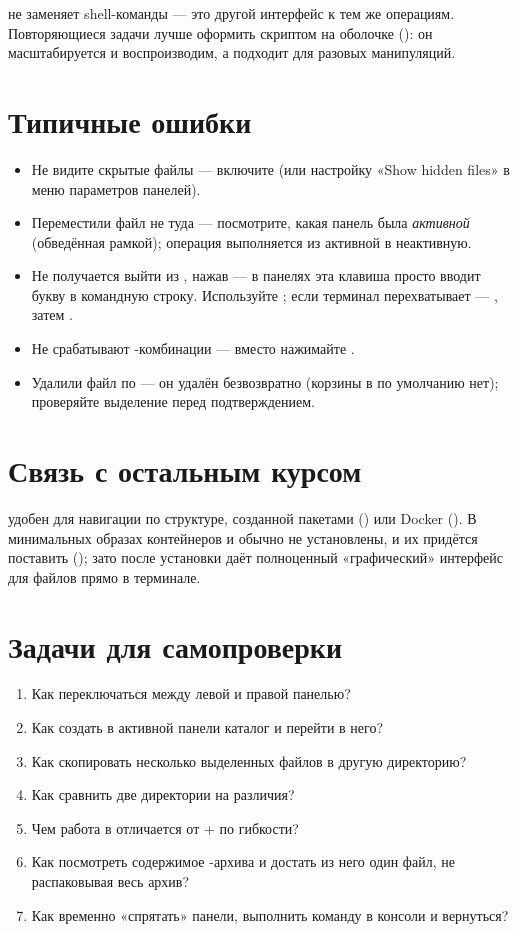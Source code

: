  не заменяет shell-команды --- это другой интерфейс
к тем же операциям. Повторяющиеся задачи лучше оформить
скриптом на оболочке (): он
масштабируется и воспроизводим, а  подходит для
разовых манипуляций.

\section{Типичные ошибки}
\begin{itemize}
  \item Не видите скрытые файлы --- включите
     (или настройку «Show hidden files» в
    меню параметров панелей).
  \item Переместили файл не туда --- посмотрите, какая
    панель была \emph{активной} (обведённая рамкой);
    операция выполняется из активной в неактивную.
  \item Не получается выйти из , нажав 
    --- в панелях эта клавиша просто вводит букву в командную
    строку. Используйте ; если терминал перехватывает
     --- , затем .
  \item Не срабатывают -комбинации --- вместо
     нажимайте .
  \item Удалили файл по  --- он удалён безвозвратно
    (корзины в  по умолчанию нет); проверяйте
    выделение перед подтверждением.
\end{itemize}

\section{Связь с остальным курсом}

 удобен для навигации по структуре, созданной
пакетами () или Docker
(). В минимальных образах
контейнеров  и  обычно не установлены, и
их придётся поставить (); зато после
установки  даёт полноценный «графический»
интерфейс для файлов прямо в терминале.

\section{Задачи для самопроверки}
\begin{enumerate}
  \item Как переключаться между левой и правой панелью?
  \item Как создать в активной панели каталог
    и перейти в него?
  \item Как скопировать несколько выделенных файлов
    в другую директорию?
  \item Как сравнить две директории на различия?
  \item Чем работа в  отличается от 
    +  по гибкости?
  \item Как посмотреть содержимое -архива и достать
    из него один файл, не распаковывая весь архив?
  \item Как временно «спрятать» панели, выполнить команду в
    консоли и вернуться?
\end{enumerate}
